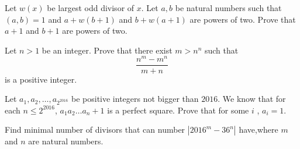 \documentclass[problems.tex]{subfile}
\begin{document}
	\begin{problem}
		Let $w(x)$ be largest odd divisor of $x$. Let $a,b$ be natural numbers such that $(a,b)=1$ and $a+w(b+1)$ and $b+w(a+1)$ are powers of two. Prove that $a+1$ and $b+1$ are powers of two. %
	\end{problem}

	\begin{problem}
		Let $n>1$ be an integer. Prove that there exist $m>n^n $ such that $$\frac {n^m-m^n}{m+n}$$ is a positive integer. %
	\end{problem}

	\begin{problem}
		Let $a_1, a_2, \dots, a_{2^{2016}}$ be positive integers not bigger than $2016$. We know that for each $n \leq 2^{2016}$, $a_1a_2 \dots a_{n} +1 $ is a perfect square. Prove that for some $i $ , $a_i=1$. %
	\end{problem}

	\begin{problem}
		Find minimal number of divisors that can number $|2016^m-36^n|$ have,where $m$ and $n$ are natural numbers. %
	\end{problem}

\end{document}
